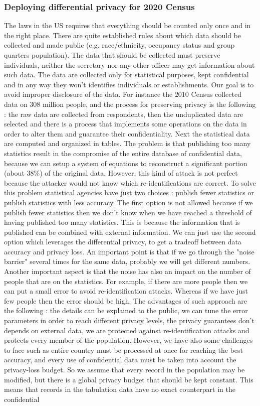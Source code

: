 \subsubsection{Deploying differential privacy for 2020 Census}
The laws in the US requires that everything should be counted only once and in the right place. There are quite established rules about which data should be collected and made public (e.g. race/ethnicity, occupancy status and group quarters population). The data that should be collected must preserve individuals, neither the secretary nor any other officer may get information about such data. The data are collected only for statistical purposes, kept confidential and in any way they won't identifies individuals or establishments. Our goal is to avoid improper disclosure of the data. For instance the $2010$ Census collected data on $308$ million people, and the process for preserving privacy is the following : the raw data are collected from respondents, then the unduplicated data are selected and there is a process that implements some operations on the data in order to alter them and guarantee their confidentiality. Next the statistical data are computed and organized in tables. The problem is that publishing too many statistics result in the compromise of the entire database of confidential data, because we can setup a system of equations to reconstruct a significant portion (about $38 \%$) of the original data. However, this kind of attack is not perfect because the attacker would not know which re-identifications are correct. To solve this problem statistical agencies have just two choices : publish fewer statistics or publish statistics with less accuracy. The first option is not allowed because if we publish fewer statistics then we don't know when we have reached a threshold of having published too many statistics. This is because the information that is published can be combined with external information. We can just use the second option which leverages the differential privacy, to get a tradeoff between data accuracy and privacy loss. An important point is that if we go through the "noise barrier" several times for the same data, probably we will get different numbers. Another important aspect is that the noise has also an impact on the number of people that are on the statistics. For example, if there are more people then we can put a small error to avoid re-identification attacks. Whereas if we have just few people then the error should be high. The advantages of such approach are the following : the details can be explained to the public, we can tune the error parameters in order to reach different privacy levels, the privacy guarantees don't depends on external data, we are protected against re-identification attacks and protects every member of the population. However, we have also some challenges to face such as entire country must be processed at once for reaching the best accuracy, and every use of confidential data must be taken into account the privacy-loss budget. So we assume that every record in the population may be modified, but there is a global privacy budget that should be kept constant. This means that records in the tabulation data have no exact counterpart in the confidential 